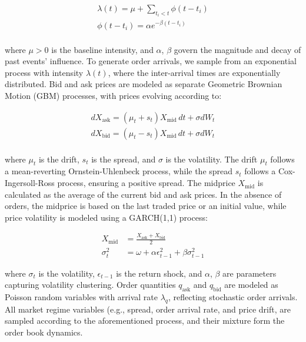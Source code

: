 \documentclass[11pt]{article}
\begin{document}
    \begin{gather*}
        \lambda(t) = \mu + \sum_{t_i < t} \phi(t - t_i)\\
        \phi(t - t_i) = \alpha e^{-\beta(t - t_i)}\\
    \end{gather*}

    where \( \mu > 0 \) is the baseline intensity, and \( \alpha \), \( \beta \) govern the magnitude and decay of past events' influence.
    To generate order arrivals, we sample from an exponential process with intensity \( \lambda(t) \),
    where the inter-arrival times are exponentially distributed.
    Bid and ask prices are modeled as separate Geometric Brownian Motion (GBM) processes, with prices evolving according to:

    \begin{gather*}
        dX_{\text{ask}} = (\mu_t + s_t) X_{\text{mid}} \, dt + \sigma dW_t\\
        dX_{\text{bid}} = (\mu_t - s_t) X_{\text{mid}} \, dt + \sigma dW_t\\
    \end{gather*}

    where \( \mu_t \) is the drift, \( s_t \) is the spread, and \( \sigma \) is the volatility.
    The drift \( \mu_t \) follows a mean-reverting Ornstein-Uhlenbeck process, while the spread \( s_t \) follows a Cox-Ingersoll-Ross process,
    ensuring a positive spread.
    The midprice \( X_{\text{mid}} \) is calculated as the average of the current bid and ask prices.
    In the absence of orders, the midprice is based on the last traded price or an initial value,
    while price volatility is modeled using a GARCH(1,1) process:

    \begin{equation*}
        \begin{aligned}
            X_{\text{mid}} &= \frac{X_{\text{ask}} + X_{\text{bid}}}{2} \\
            \sigma_t^2 &= \omega + \alpha \epsilon_{t-1}^2 + \beta \sigma_{t-1}^2
        \end{aligned}
    \end{equation*}

    where \( \sigma_t \) is the volatility, \( \epsilon_{t-1} \) is the return shock, and \( \alpha \), \( \beta \) are parameters capturing volatility clustering.
    Order quantities \( q_{\text{ask}} \) and \( q_{\text{bid}} \) are modeled as Poisson random variables with arrival rate \( \lambda_q \),
    reflecting stochastic order arrivals.
    All market regime variables (e.g., spread, order arrival rate, and price drift, are sampled according to the aforementioned process,
    and their mixture form the order book dynamics.
\end{document}
